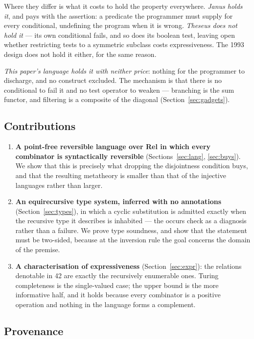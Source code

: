\documentclass[runningheads,envcountsame]{llncs}
\newcommand{\Rel}{\textbf{Rel}}
\begin{document}
Where they differ is what it costs to hold the property everywhere. \emph{Janus
holds it}, and pays with the assertion: a predicate the programmer must supply for
every conditional, undefining the program when it is wrong. \emph{Theseus does not
hold it} --- its own conditional fails, and so does its boolean test, leaving open
whether restricting tests to a symmetric subclass costs expressiveness. The 1993
design does not hold it either, for the same reason.

\emph{This paper's language holds it with neither price}: nothing for the
programmer to discharge, and no construct excluded. The mechanism is that there is
no conditional to fail it and no test operator to weaken --- branching is the sum
functor, and filtering is a composite of the diagonal (Section~\ref{sec:gadgets}).

\subsection{Contributions}

\begin{enumerate}
\item \textbf{A point-free reversible language over \Rel{} in which every
  combinator is syntactically reversible} (Sections~\ref{sec:lang},
  \ref{sec:buys}). We show that this is precisely what dropping the disjointness
  condition buys, and that the resulting metatheory is smaller than that of the
  injective languages rather than larger.
\item \textbf{An equirecursive type system, inferred with no annotations}
  (Section~\ref{sec:types}), in which a cyclic substitution is admitted exactly
  when the recursive type it describes is inhabited --- the occurs check as a
  diagnosis rather than a failure. We prove type soundness, and show that the
  statement must be two-sided, because at the inversion rule the goal concerns the
  domain of the premise.
\item \textbf{A characterisation of expressiveness} (Section~\ref{sec:expr}): the
  relations denotable in 42 are exactly the recursively enumerable ones. Turing
  completeness is the single-valued case; the upper bound is the more informative
  half, and it holds because every combinator is a positive operation and nothing
  in the language forms a complement.
\end{enumerate}

\subsection{Provenance}\label{sec:prov}
\end{document}
